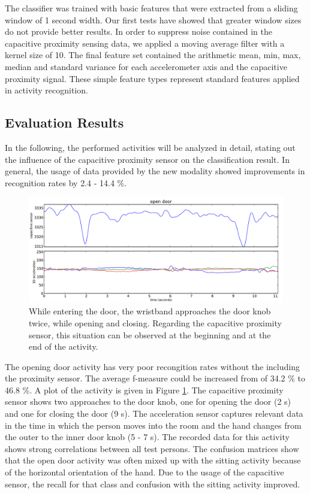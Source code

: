 \documentclass[runningheads,a4paper]{llncs}
\begin{document}
The classifier was trained with basic features that were extracted from a sliding window of 1 second width. Our first tests have showed that greater window sizes do not provide better results. In order to suppress noise contained in the capacitive proximity sensing data, we applied a moving average filter with a kernel size of 10. The final feature set contained the arithmetic mean, min, max, median and standard variance for each accelerometer axis and the capacitive proximity signal. These simple feature types represent standard features applied in activity recognition. 

\subsection{Evaluation Results}
\label{sect:evaluation}

In the following, the performed activities will be analyzed in detail, stating out the influence of the capacitive proximity sensor on the classification result. In general, the usage of data provided by the new modality showed improvements in recognition rates by 2.4 - 14.4 \%.

\begin{figure}[htbp]
	\centering
		\includegraphics[width=1.00\textwidth]{../Auswertung/images/tobias_1.pdf}
	\caption{While entering the door, the wristband approaches the door knob twice, while opening and closing. Regarding the capacitive proximity sensor, this situation can be observed at the beginning and at the end of the activity.}
	\label{fig:tobias_1}
\end{figure}

The opening door activity has very poor recongition rates without the including the proximity sensor. The average f-measure could be increased from of 34.2 \% to 46.8 \%. A plot of the activity is given in Figure \ref{fig:tobias_1}. The capacitive proximity sensor shows two approaches to the door knob, one for opening the door (2 s) and one for closing the door (9 s). The acceleration sensor captures relevant data in the time in which the person moves into the room and the hand changes from the outer to the inner door knob (5 - 7 s). The recorded data for this activity shows strong correlations between all test persons. The confusion matrices show that the open door activity was often mixed up with the sitting activity because of the horizontal orientation of the hand. Due to the usage of the capacitive sensor, the recall for that class and confusion with the sitting activity improved. 
\end{document}
